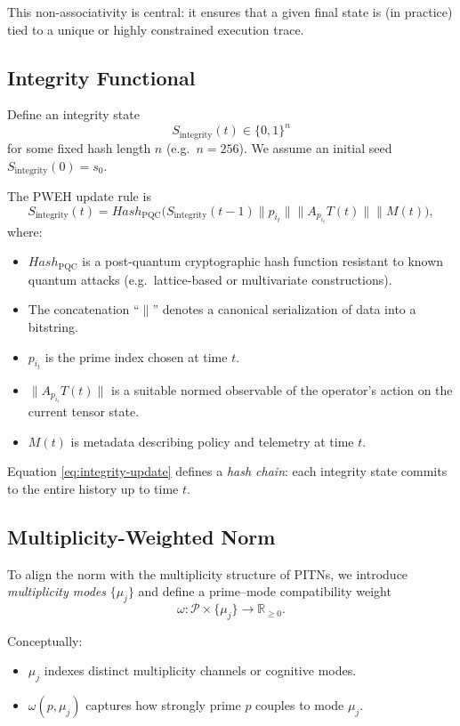 \documentclass[11pt]{article}
\begin{document}
This non-associativity is central:
it ensures that a given final state is (in practice) tied to a unique or highly constrained execution trace.

\subsection{Integrity Functional}

Define an integrity state
\[
  S_{\text{integrity}}(t) \in \{0,1\}^n
\]
for some fixed hash length \(n\) (e.g.\ \(n = 256\)).
We assume an initial seed \(S_{\text{integrity}}(0) = s_0\).

The PWEH update rule is
\begin{equation}
  S_{\text{integrity}}(t)
  =
  Hash_{\text{PQC}}\Big(
    S_{\text{integrity}}(t-1)
    \parallel p_{i_t}
    \parallel \|A_{p_{i_t}}T(t)\|
    \parallel M(t)
  \Big),
  \label{eq:integrity-update}
\end{equation}
where:
\begin{itemize}[leftmargin=1.5em]
  \item \(Hash_{\text{PQC}}\) is a post-quantum cryptographic hash function resistant to known quantum attacks (e.g.\ lattice-based or multivariate constructions).
  \item The concatenation ``\(\parallel\)'' denotes a canonical serialization of data into a bitstring.
  \item \(p_{i_t}\) is the prime index chosen at time \(t\).
  \item \(\|A_{p_{i_t}}T(t)\|\) is a suitable normed observable of the operator's action on the current tensor state.
  \item \(M(t)\) is metadata describing policy and telemetry at time \(t\).
\end{itemize}

Equation \eqref{eq:integrity-update} defines a \emph{hash chain}:
each integrity state commits to the entire history up to time \(t\).

\subsection{Multiplicity-Weighted Norm}

To align the norm with the multiplicity structure of PITNs, we introduce \emph{multiplicity modes} \(\{\mu_j\}\) and define a prime--mode compatibility weight
\[
  \omega: \mathcal{P} \times \{\mu_j\} \to \mathbb{R}_{\ge 0}.
\]

Conceptually:
\begin{itemize}[leftmargin=1.5em]
  \item \(\mu_j\) indexes distinct multiplicity channels or cognitive modes.
  \item \(\omega(p,\mu_j)\) captures how strongly prime \(p\) couples to mode \(\mu_j\).
\end{itemize}
\end{document}
